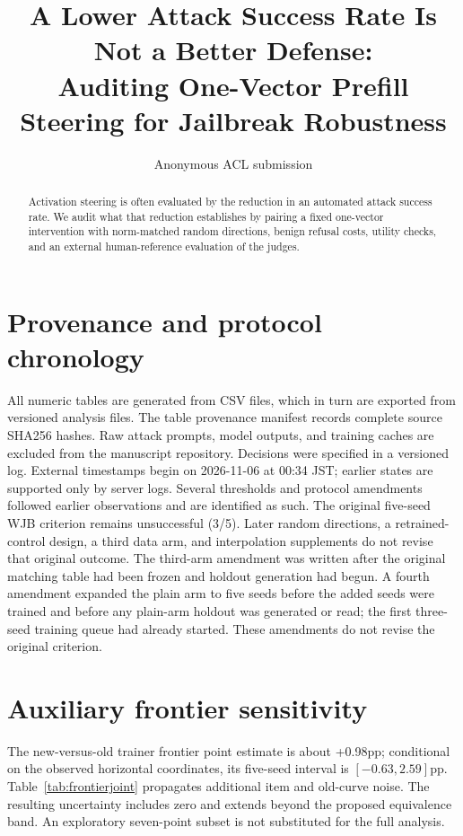\documentclass[11pt]{article}
\title{A Lower Attack Success Rate Is Not a Better Defense:\\Auditing One-Vector Prefill Steering for Jailbreak Robustness}
\author{Anonymous ACL submission}
\begin{document}


\maketitle
\begin{abstract}
Activation steering is often evaluated by the reduction in an automated attack success rate. We audit what that reduction establishes by pairing a fixed one-vector intervention with norm-matched random directions, benign refusal costs, utility checks, and an external human-reference evaluation of the judges.
\end{abstract}









\appendix



\section{Provenance and protocol chronology}
All numeric tables are generated from CSV files, which in turn are exported from versioned analysis files. The table provenance manifest records complete source SHA256 hashes. Raw attack prompts, model outputs, and training caches are excluded from the manuscript repository. Decisions were specified in a versioned log. External timestamps begin on 2026-11-06 at 00:34 JST; earlier states are supported only by server logs. Several thresholds and protocol amendments followed earlier observations and are identified as such.
The original five-seed WJB criterion remains unsuccessful (3/5). Later random directions, a retrained-control design, a third data arm, and interpolation supplements do not revise that original outcome. The third-arm amendment was written after the original matching table had been frozen and holdout generation had begun. A fourth amendment expanded the plain arm to five seeds before the added seeds were trained and before any plain-arm holdout was generated or read; the first three-seed training queue had already started. These amendments do not revise the original criterion.
\section{Auxiliary frontier sensitivity}
The new-versus-old trainer frontier point estimate is about +0.98pp; conditional on the observed horizontal coordinates, its five-seed interval is $[-0.63,2.59]$pp. Table~\ref{tab:frontierjoint} propagates additional item and old-curve noise. The resulting uncertainty includes zero and extends beyond the proposed equivalence band. An exploratory seven-point subset is not substituted for the full analysis.

\end{document}
